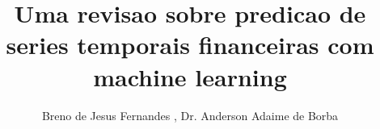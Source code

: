 
\sloppy

\title{Uma revisao sobre predicao de series temporais financeiras com machine learning}

\author{Breno de Jesus Fernandes , Dr. Anderson Adaime de Borba}

\address{
	Ciência da Computação\\
	Faculdade de Computação e Informática\\
	Universidade Presbiteriana Mackenzie\\
	São Paulo -- SP -- Brasil
}

